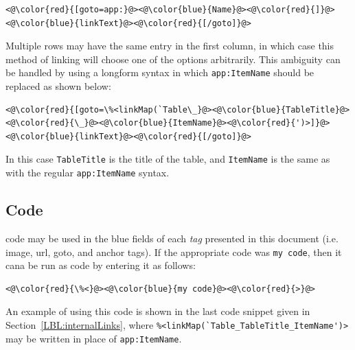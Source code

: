 \documentclass{article}
\begin{document}
\begin{lstlisting}
<@\color{red}{[goto=app:}@><@\color{blue}{Name}@><@\color{red}{]}@><@\color{blue}{linkText}@><@\color{red}{[/goto]}@>
\end{lstlisting}

\vspace{0.7em}
Multiple rows may have the same entry in the first column, in which case this method of linking will choose one of the options arbitrarily.
This ambiguity can be handled by using a longform syntax in which \verb|app:ItemName| should be replaced as shown below:

\begin{lstlisting}
<@\color{red}{[goto=\%<linkMap(`Table\_}@><@\color{blue}{TableTitle}@><@\color{red}{\_}@><@\color{blue}{ItemName}@><@\color{red}{')>]}@><@\color{blue}{linkText}@><@\color{red}{[/goto]}@>
\end{lstlisting}

\noindent In this case \verb|TableTitle| is the title of the table, and \verb|ItemName| is the same as with the regular \verb|app:ItemName| syntax.


\subsection{Code}
\matlab code may be used in the blue fields of each \emph{tag} presented in this document (i.e. image, url, goto, and anchor tags). 
If the appropriate code was \verb|my code|, then it cana be run as \matlab code by entering it as follows: 

\begin{lstlisting}
<@\color{red}{\%<}@><@\color{blue}{my code}@><@\color{red}{>}@>
\end{lstlisting}

An example of using this  \matlab code is shown in the last code snippet given in Section~\ref{LBL:internalLinks}, where \verb|%<linkMap(`Table_TableTitle_ItemName')>| may be written in place of \verb|app:ItemName|.
\end{document}
